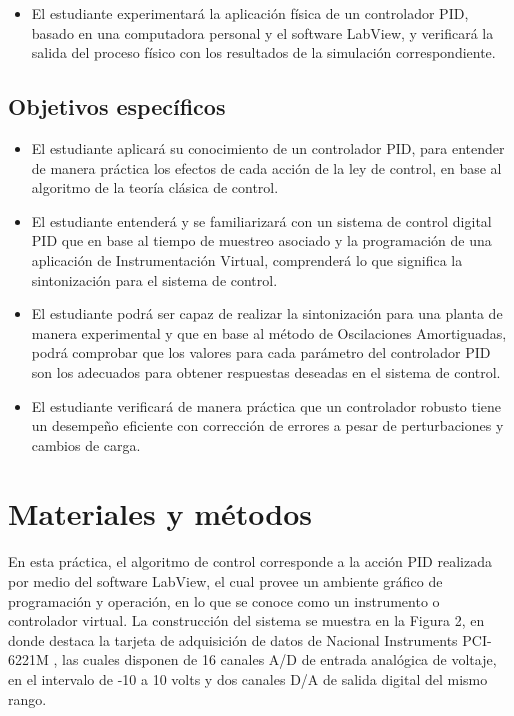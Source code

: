 \documentclass[]{article}
\begin{document}
\begin{itemize}
	\item El estudiante experimentará la aplicación física de un controlador PID, basado en una computadora personal y el software LabView, y verificará la salida del proceso físico con los resultados de la simulación correspondiente.
	\end{itemize}

\subsection{Objetivos específicos}

\begin{itemize}
	\item El estudiante aplicará su conocimiento de un controlador PID, para entender de manera práctica los efectos de cada acción de la ley de control, en base al algoritmo de la teoría clásica de control.

  \item El estudiante entenderá y se familiarizará con un sistema de control digital PID que en base al tiempo de muestreo asociado y la programación de una aplicación de Instrumentación Virtual, comprenderá lo que significa la sintonización para el sistema de control.

\item El estudiante podrá ser capaz de realizar la sintonización para una planta de manera experimental y que en base al método de Oscilaciones Amortiguadas, podrá comprobar que los valores para cada parámetro del controlador PID son los adecuados para obtener respuestas deseadas en el sistema de control.

 \item El estudiante verificará de manera práctica que un controlador robusto tiene un desempeño eficiente con corrección de errores a pesar de perturbaciones y cambios de carga.
	\end{itemize}


\section{Materiales y métodos}

 En esta práctica, el algoritmo de control corresponde a la acción PID realizada por medio del software LabView, el cual provee un ambiente gráfico de programación y operación, en lo que se conoce como un instrumento o controlador virtual. La construcción del sistema se muestra en la Figura 2, en donde destaca la tarjeta de adquisición de datos de Nacional Instruments PCI-6221M , las cuales disponen de 16 canales A/D de entrada analógica de voltaje, en el intervalo de -10 a 10 volts y dos canales D/A de salida digital del mismo rango. \\
		
\end{document}
